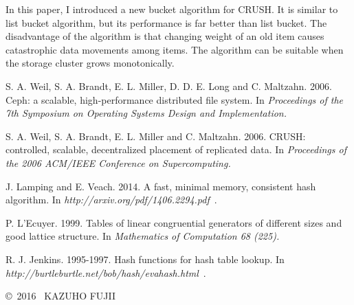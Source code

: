 \documentclass[a4paper,11pt]{article}
\begin{document}
In this paper, I introduced a new bucket algorithm for CRUSH.
It is similar to list bucket algorithm, but its performance is far better than list bucket.
The disadvantage of the algorithm is that changing weight of an old item causes catastrophic data movements among items.
The algorithm can be suitable when the storage cluster grows monotonically.

\begin{thebibliography}{9}

 S. A. Weil, S. A. Brandt, E. L. Miller, D. D. E. Long and C. Maltzahn. 2006.
Ceph: a scalable, high-performance distributed file system.
In {\it Proceedings of the 7th Symposium on Operating Systems Design and Implementation.}

 S. A. Weil, S. A. Brandt, E. L. Miller and C. Maltzahn. 2006.
CRUSH: controlled, scalable, decentralized placement of replicated data.
In {\it Proceedings of the 2006 ACM/IEEE Conference on
Supercomputing.}

 J. Lamping and E. Veach. 2014.
A fast, minimal memory, consistent hash algorithm.
In {\it http://arxiv.org/pdf/1406.2294.pdf}\ .

 P. L'Ecuyer. 1999.
Tables of linear congruential generators of different sizes and good lattice structure.
In {\it Mathematics of Computation 68 (225).}

 R. J. Jenkins. 1995-1997.
Hash functions for hash table lookup.
In {\it http://burtleburtle.net/bob/hash/evahash.html}\ .

\end{thebibliography}


\copyright\ 2016 \ KAZUHO FUJII
\end{document}

